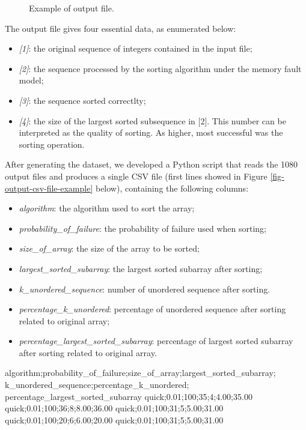 \begin{figure}[H]
    \centering
    \fbox{
    \theverbbox
    }
    \caption{Example of output file.}
    \label{fig-output-file-example}
\end{figure}

The output file gives four essential data, as enumerated below:
\begin{itemize}
    \item \textit{[1]}: the original sequence of integers contained in the input file;
    \item \textit{[2]}: the sequence processed by the sorting algorithm under the memory fault model;
    \item \textit{[3]}: the sequence sorted correctlty;
    \item \textit{[4]}: the size of the largest sorted subsequence in [2]. This number can be interpreted as the quality of sorting. As higher, most successful was the sorting operation.
\end{itemize}

After generating the dataset, we developed a Python script that reads the 1080 output files and produces a single CSV file (first lines showed in Figure \ref{fig-output-csv-file-example} below), containing the following columns:
\begin{itemize}
    \item \textit{algorithm}: the algorithm used to sort the array;
    \item \textit{probability\_of\_failure}: the probability of failure used when sorting;
    \item \textit{size\_of\_array}: the size of the array to be sorted;
    \item \textit{largest\_sorted\_subarray}: the largest sorted subarray after sorting;
    \item \textit{k\_unordered\_sequence}: number of unordered sequence after sorting.
    \item \textit{percentage\_k\_unordered}: percentage of unordered sequence after sorting related to original array;
    \item \textit{percentage\_largest\_sorted\_subarray}: percentage of largest sorted subarray after sorting related to original array.
\end{itemize}

\begin{verbbox}[\mbox{}]
algorithm;probability_of_failure;size_of_array;largest_sorted_subarray;
k_unordered_sequence;percentage_k_unordered;
percentage_largest_sorted_subarray
quick;0.01;100;35;4;4.00;35.00
quick;0.01;100;36;8;8.00;36.00
quick;0.01;100;31;5;5.00;31.00
quick;0.01;100;20;6;6.00;20.00
quick;0.01;100;31;5;5.00;31.00
\end{verbbox}
        
